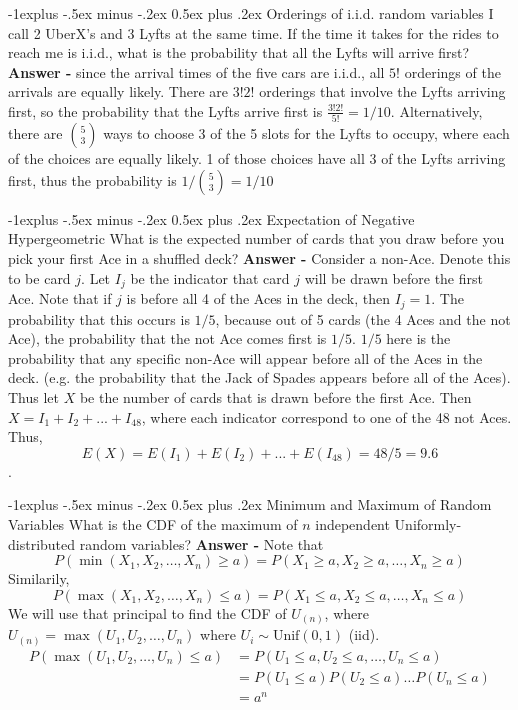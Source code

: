 \documentclass[10pt,landscape]{article}
\makeatletter
\theoremstyle{definition}
\newcommand{\Unif}{\textrm{Unif}}
\renewcommand{\subsection}{\@startsection{subsection}{2}{0mm}%
                                {-1explus -.5ex minus -.2ex}%
                                {0.5ex plus .2ex}%
                                {\normalfont\normalsize\bfseries}}
\makeatother
\begin{document}
\begin{multicols}{3}
\subsection{Orderings of i.i.d. random variables}
I call 2 UberX's and 3 Lyfts at the same time. If the time it takes for the rides to reach me is i.i.d., what is the probability that all the Lyfts will arrive first? \textbf{Answer - } since the arrival times of the five cars are i.i.d., all $5!$ orderings of the arrivals are equally likely. There are $3!2!$ orderings that involve the Lyfts arriving first, so the probability that the Lyfts arrive first is $\boxed{\frac{3!2!}{5!} = 1/10}$. Alternatively, there are ${5 \choose 3}$ ways to choose 3 of the 5 slots for the Lyfts to occupy, where each of the choices are equally likely. 1 of those choices have all 3 of the Lyfts arriving first, thus the probability is $\boxed{1 / {5 \choose 3} = 1/10}$

\subsection{Expectation of Negative Hypergeometric}
What is the expected number of cards that you draw before you pick your first Ace in a shuffled deck?
\textbf{Answer -} Consider a non-Ace. Denote this to be card $j$. Let $I_j$ be the indicator that card $j$ will be drawn before the first Ace. Note that if $j$ is before all 4 of the Aces in the deck, then $I_j = 1$. The probability that this occurs is $1/5$, because out of 5 cards (the 4 Aces and the not Ace), the probability that the not Ace comes first is $1/5$. $1/5$ here is the probability that any specific non-Ace will appear before all of the Aces in the deck. (e.g. the probability that the Jack of Spades appears before all of the Aces). Thus let $X$ be the number of cards that is drawn before the first Ace. Then $X = I_1 + I_2 + ... + I_{48}$, where each indicator correspond to one of the 48 not Aces. Thus, \[E(X) = E(I_1) + E(I_2) + ... + E(I_{48}) = 48/5 = \boxed{9.6}\].

\subsection{Minimum and Maximum of Random Variables}
What is the CDF of the maximum of $n$ independent Uniformly-distributed random variables? \textbf{Answer - } Note that \[ P(\min(X_1, X_2, \dots, X_n) \geq a) = P(X_1 \geq a, X_2 \geq a, \dots, X_n \geq a) \] Similarily, \[ P(\max(X_1, X_2, \dots, X_n) \leq a) = P(X_1 \leq a, X_2 \leq a, \dots, X_n \leq a) \] We will use that principal to find the CDF of $U_{(n)}$, where $U_{(n)} = \max(U_1, U_2, \dots, U_n)$ where $U_i \sim \Unif(0, 1)$ (iid). \begin{align*} P(\max(U_1, U_2, \dots, U_n) \leq a)
&= P(U_1 \leq a, U_2 \leq a, \dots, U_n \leq a) \\
&= P(U_1 \leq a)P(U_2 \leq a)\dots P(U_n \leq a) \\
&= \boxed{a^n}
\end{align*}


\end{multicols}
\end{document}
